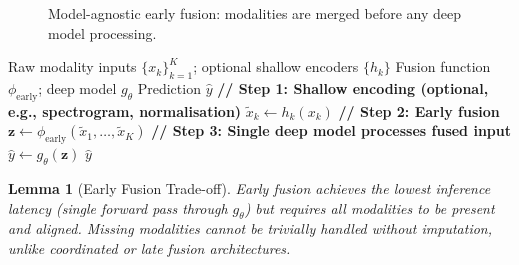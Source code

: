\documentclass[12pt,a4paper]{article}
\theoremstyle{definition}
\theoremstyle{plain}
\newtheorem{lemma}[theorem]{Lemma}
\theoremstyle{remark}
\begin{document}
\begin{figure}[H]
\centering
{}
\caption{Model-agnostic early fusion: modalities are merged before any deep model processing.}
\label{fig:early_fusion}
\end{figure}

\begin{algorithm}[H]
\caption{Model-Agnostic Early Fusion}
\label{alg:early_fusion}
\begin{algorithmic}[1]
\Require Raw modality inputs $\{x_k\}_{k=1}^K$; optional shallow encoders $\{h_k\}$
\Require Fusion function $\phi_{\text{early}}$; deep model $g_\theta$
\Ensure Prediction $\hat{y}$
\State \textbf{// Step 1: Shallow encoding (optional, e.g., spectrogram, normalisation)}
  \State $\tilde{x}_k \gets h_k(x_k)$ 
\EndFor
\State \textbf{// Step 2: Early fusion}
\State $\mathbf{z} \gets \phi_{\text{early}}(\tilde{x}_1, \ldots, \tilde{x}_K)$ 
\State \textbf{// Step 3: Single deep model processes fused input}
\State $\hat{y} \gets g_\theta(\mathbf{z})$
\State \Return $\hat{y}$
\end{algorithmic}
\end{algorithm}

\begin{lemma}[Early Fusion Trade-off]
Early fusion achieves the lowest inference latency (single forward pass through $g_\theta$) but requires all modalities to be present and aligned. Missing modalities cannot be trivially handled without imputation, unlike coordinated or late fusion architectures.
\end{lemma}
\end{document}
